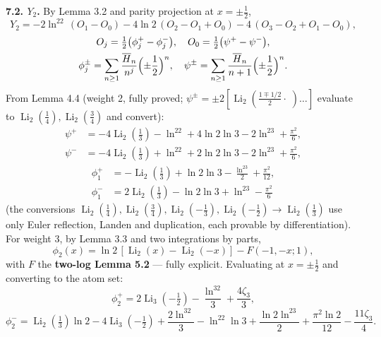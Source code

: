 \documentclass[11pt]{article}
\theoremstyle{remark}
\begin{document}
\textbf{7.2. $Y_2$.} By Lemma 3.2 and parity projection at $x=\pm\tfrac12$,
\[
Y_2=-2\ln^22\,(O_1-O_0)-4\ln2\,(O_2-O_1+O_0)-4\,(O_3-O_2+O_1-O_0),
\]
\[
\begin{gathered}
O_j=\tfrac12\bigl(\phi_j^+-\phi_j^-\bigr),\quad O_0=\tfrac12\bigl(\psi^+-\psi^-\bigr),\\
\phi_j^{\pm}=\sum_{n\ge1}\frac{\overline H_n}{n^j}\Bigl(\pm\frac12\Bigr)^{n},\quad
\psi^{\pm}=\sum_{n\ge1}\frac{\overline H_n}{n+1}\Bigl(\pm\frac12\Bigr)^{n}.
\end{gathered}
\]
From Lemma 4.4 (weight 2, fully proved; $\psi^\pm=\pm2[\operatorname{Li}_2(\tfrac{1\mp1/2}{2}\cdot\!\!\;)\ldots]$ evaluate to $\operatorname{Li}_2(\tfrac14),\operatorname{Li}_2(\tfrac34)$ and convert):
\[
\begin{aligned}
\psi^{+}&=-4\operatorname{Li}_2(\tfrac13)-\ln^22+4\ln2\ln3-2\ln^23+\frac{\pi^2}{6},\\
\psi^{-}&=-4\operatorname{Li}_2(\tfrac13)+\ln^22+2\ln2\ln3-2\ln^23+\frac{\pi^2}{6},
\end{aligned}
\]
\[
\begin{aligned}
\phi_1^{+}&=-\operatorname{Li}_2(\tfrac13)+\ln2\ln3-\frac{\ln^23}{2}+\frac{\pi^2}{12},\\
\phi_1^{-}&=2\operatorname{Li}_2(\tfrac13)-\ln2\ln3+\ln^23-\frac{\pi^2}{6}
\end{aligned}
\]
(the conversions $\operatorname{Li}_2(\tfrac14),\operatorname{Li}_2(\tfrac34),\operatorname{Li}_2(-\tfrac13),\operatorname{Li}_2(-\tfrac12)\to\operatorname{Li}_2(\tfrac13)$ use only Euler reflection, Landen and duplication, each provable by differentiation).
For weight 3, by Lemma 3.3 and two integrations by parts,
\[
\phi_2(x)=\ln2\,[\operatorname{Li}_2(x)-\operatorname{Li}_2(-x)]-F(-1,-x;1),
\]
with $F$ the \textbf{two-log Lemma 5.2} --- fully explicit. Evaluating at $x=\pm\tfrac12$ and converting to the atom set:
\[
\phi_2^{+}=2\operatorname{Li}_3(-\tfrac12)-\frac{\ln^32}{3}+\frac{4\zeta_3}{3},
\]
\[
\phi_2^{-}=\operatorname{Li}_2(\tfrac13)\ln2-4\operatorname{Li}_3(-\tfrac12)+\frac{2\ln^32}{3}-\ln^22\ln3+\frac{\ln2\ln^23}{2}+\frac{\pi^2\ln2}{12}-\frac{11\zeta_3}{4}.
\]
\end{document}
